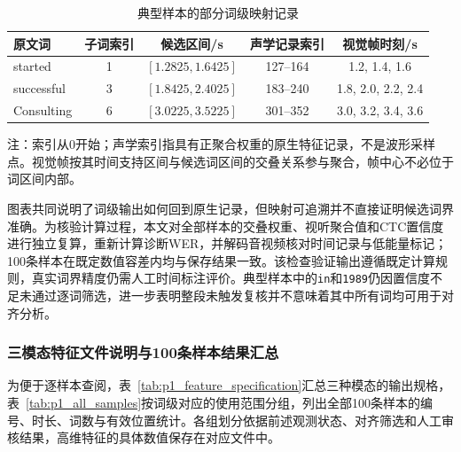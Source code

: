 \begin{table}[H]
    \centering\small
    \caption{典型样本的部分词级映射记录}
    \label{tab:p1_mapping_records}
    \setlength{\tabcolsep}{6pt}
    \renewcommand{\arraystretch}{1.12}
    \ifdefined\pOneCompactTableBox\else\newsavebox{\pOneCompactTableBox}\fi
    \begin{lrbox}{\pOneCompactTableBox}
    \begin{tabular}{lcccc}
        \toprule
        原文词 & 子词索引 & 候选区间/s & 声学记录索引 & 视觉帧时刻/s\\
        \midrule
        started & 1 & $[1.2825,1.6425]$ & 127--164 & 1.2, 1.4, 1.6\\
        successful & 3 & $[1.8425,2.4025]$ & 183--240 & 1.8, 2.0, 2.2, 2.4\\
        Consulting & 6 & $[3.0225,3.5225]$ & 301--352 & 3.0, 3.2, 3.4, 3.6\\
        \bottomrule
    \end{tabular}
    \end{lrbox}
    \usebox{\pOneCompactTableBox}
\par\smallskip
\parbox{\wd\pOneCompactTableBox}{\footnotesize 注：索引从0开始；声学索引指具有正聚合权重的原生特征记录，不是波形采样点。视觉帧按其时间支持区间与候选词区间的交叠关系参与聚合，帧中心不必位于词区间内部。}
\end{table}

图表共同说明了词级输出如何回到原生记录，但映射可追溯并不直接证明候选词界准确。为核验计算过程，本文对全部样本的交叠权重、视听聚合值和CTC置信度进行独立复算，重新计算诊断WER，并解码音视频核对时间记录与低能量标记；100条样本在既定数值容差内均与保存结果一致。该检查验证输出遵循既定计算规则，真实词界精度仍需人工时间标注评价。典型样本中的\texttt{in}和\texttt{1989}仍因置信度不足未通过逐词筛选，进一步表明整段未触发复核并不意味着其中所有词均可用于对齐分析。

\subsubsection{三模态特征文件说明与100条样本结果汇总}
\label{sec:p1_delivery}

为便于逐样本查阅，表~\ref{tab:p1_feature_specification}汇总三种模态的输出规格，表~\ref{tab:p1_all_samples}按词级对应的使用范围分组，列出全部100条样本的编号、时长、词数与有效位置统计。各组划分依据前述观测状态、对齐筛选和人工审核结果，高维特征的具体数值保存在对应文件中。

